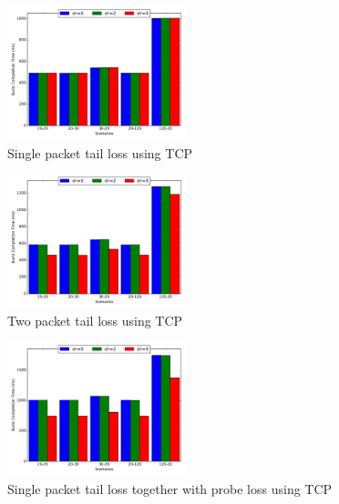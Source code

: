 \documentclass[10pt,draftcls,twocolumn]{IEEEconf}
\begin{document}
\begin{figure}[!ht]
\begin{center}
\includegraphics[angle=0, width=0.46\textwidth,natwidth=578.16,natheight=433.62]{plots/T1P.pdf}
\caption{Single packet tail loss using TCP}\label{t1p}
\end{center}
\end{figure}



\begin{figure}[!ht]
\begin{center}
\includegraphics[angle=0, width=0.46\textwidth,natwidth=578.16,natheight=433.62]{plots/T2P.pdf}
\caption{Two packet tail loss using TCP}\label{t2p}
\end{center}
\end{figure}


\begin{figure}[!ht]
\begin{center}
\includegraphics[angle=0, width=0.46\textwidth, natwidth=578.16,natheight=433.62]{plots/T1PP.pdf}
\caption{Single packet tail loss together with probe loss using TCP}\label{t1pp}
\end{center}
\end{figure}
\end{document}
